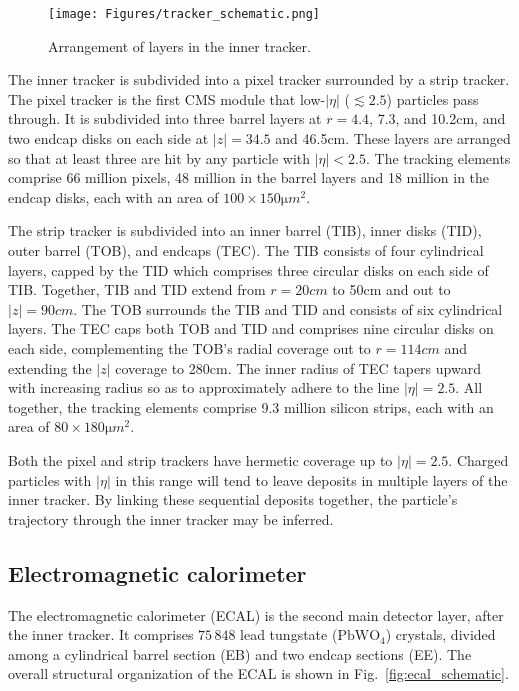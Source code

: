 \begin{figure}[hbtp]
  \begin{center}
    \texttt{[image: Figures/tracker\_schematic.png]}
    \caption{
    Arrangement of layers in the inner tracker.
    }
    \label{fig:inner_tracker}
  \end{center}
\end{figure}

The inner tracker is subdivided into a pixel tracker surrounded by a strip tracker. The pixel tracker is the first CMS module that
low-$|\eta|$ ($\lesssim 2.5$) particles pass through. It is subdivided into three barrel layers at $r = 4.4$, 7.3, and 10.2\unit{cm},
and two endcap disks on each side at $|z| = 34.5$ and 46.5\unit{cm}. These layers are arranged so that at least three are hit by
any particle with $|\eta| < 2.5$.
The tracking elements comprise 66 million pixels, 48 million in the barrel layers
and 18 million in the endcap disks, each with an area of $100{\times}150\unit{\micro m}^{2}$.

The strip tracker is subdivided into an inner barrel (TIB), inner disks (TID), outer barrel (TOB), and endcaps (TEC).
The TIB consists of four cylindrical layers, capped by the TID which comprises three circular disks on each side of TIB.
Together, TIB and TID extend from $r = 20\unit{cm}$ to 50\unit{cm} and out to $|z| = 90\unit{cm}$.
The TOB surrounds the TIB and TID and consists of six cylindrical layers. The TEC caps both TOB and TID and comprises
nine circular disks on each side, complementing the TOB's radial coverage out to $r = 114\unit{cm}$ and extending the $|z|$ coverage
to 280\unit{cm}. The inner radius of TEC tapers upward with increasing radius so as to approximately adhere to the line $|\eta| = 2.5$.
All together, the tracking elements comprise 9.3 million silicon strips, each with an area of $80{\times}180\unit{\micro m}^{2}$.

Both the pixel and strip trackers have hermetic coverage up to $|\eta| = 2.5$. Charged particles with $|\eta|$ in this range will
tend to leave deposits in multiple layers of the inner tracker. By linking these sequential deposits together, the particle's trajectory through the inner
tracker may be inferred.

\subsection{Electromagnetic calorimeter} \label{sec:LHCCMS_CMS_ECAL}
The electromagnetic calorimeter (ECAL) is the second main detector layer, after the inner tracker. It comprises $75\,848$ lead tungstate ($\mathrm{PbWO}_{4}$)
crystals, divided among a cylindrical barrel section (EB) and two endcap sections (EE). The overall structural organization of the ECAL is shown in Fig.~\ref{fig:ecal_schematic}.

